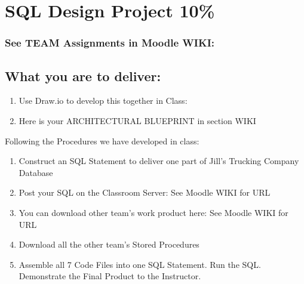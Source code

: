 
\section{SQL Design Project 10\%}

\subsubsection{See TEAM Assignments in Moodle WIKI:}

\subsection{What you are to deliver:}

\begin{enumerate}
\item Use Draw.io to develop this together in Class: 
\item Here is your ARCHITECTURAL BLUEPRINT in section WIKI
\end{enumerate}

\vspace{.5cm}
Following the Procedures we have developed in class:
\begin{enumerate}
    \item Construct an SQL Statement to deliver one part of Jill's Trucking Company Database
    \item Post your SQL on the Classroom Server: See Moodle WIKI for URL

    \item You can download other team's work product here: See Moodle WIKI for URL

    \item Download all the other team's Stored Procedures
    \item Assemble all 7 Code Files into one SQL Statement. Run the SQL. Demonstrate the Final Product to the Instructor.
\end{enumerate}

